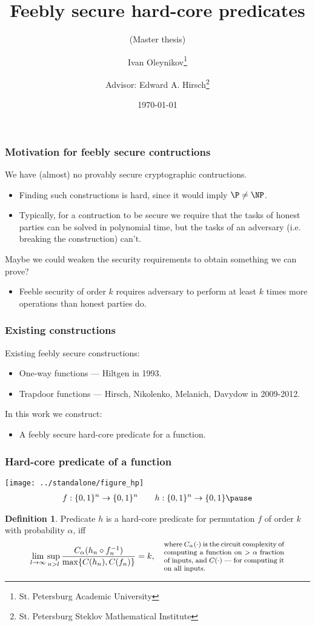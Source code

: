 \documentclass[mathserif,serif]{beamer} %
\title{Feebly secure hard-core predicates}
\subtitle{(Master thesis)}
\author{Ivan Oleynikov\thanks{St. Petersburg Academic University} \and Advisor: Edward A. Hirsch\thanks{St. Petersburg Steklov Mathematical Institute}}
\date{\today}
\theoremstyle{definition}
\newtheorem{defn}{Definition}
\begin{document}
\frame{\titlepage}

\begin{frame}
  \frametitle{Motivation for feebly secure contructions}
  We have (almost) no provably secure cryptographic contructions.
  \begin{itemize}
  \item Finding such constructions is hard, since it would imply $\P \neq \NP$.
  \item Typically, for a contruction to be secure we require that the tasks of
  honest parties can be solved in polynomial time, but the tasks of an adversary
  (i.e. breaking the construction) can't.
  \end{itemize}
  \pause
  Maybe we could weaken the security requirements to obtain something we can
  prove?
  \begin{itemize}
  \item Feeble security of order $k$ requires adversary to perform at least $k$
  times more operations than honest parties do.
  \end{itemize}
\end{frame}

\begin{frame}
  \frametitle{Existing constructions}
  Existing feebly secure constructions:
  \begin{itemize}
  \item One-way functions --- Hiltgen in 1993.
  \item Trapdoor functions --- Hirsch, Nikolenko, Melanich, Davydow in 2009-2012.
  \end{itemize}
  \pause
  In this work we construct:
  \begin{itemize}
  \item A feebly secure hard-core predicate for a function.
  \end{itemize}
\end{frame}

\begin{frame}
  \frametitle{Hard-core predicate of a function}
  {
    \centering
    \texttt{[image: ../standalone/figure\_hp]}
    \[
    \begin{aligned}
    f : \{0, 1\}^n \to \{0, 1\}^n
    & \quad &
    h : \{0, 1\}^n \to \{0, 1\}
    \pause
    \end{aligned}
    \]
  }
  \begin{defn}
  Predicate $h$ is a hard-core predicate for permutation $f$ of order $k$
  with probability $\alpha$, iff
  \[
  \lim_{l \to \infty} \sup_{n > l} \frac {C_\alpha(h_n \circ f_n^{-1})} {\max \{ C(h_n), C(f_n) \}} = k, \quad
  \parbox{5cm}{ \footnotesize
     where $C_\alpha(\cdot)$ is the circuit complexity of computing a function
     on $> \alpha$ fraction of inputs, and $C(\cdot)$ --- for computing it on
     all inputs.
  }
  \]
  \end{defn}
\end{frame}
\end{document}
